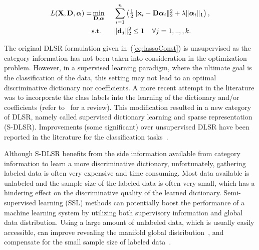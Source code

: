 \documentclass{llncs}
\begin{document}
\begin{equation}\label{eq:lassoConst}
\begin{aligned}
L(\mathbf{X},\mathbf{D},\bm{\alpha})=
& \min_{\mathbf{D},\bm{\alpha}}\
& & \sum_{i=1}^{n}\begin{pmatrix}\frac{1}{2}\|\mathbf{x}_i-\mathbf{D}\bm{\alpha}_i\|_{\textup{2}}^{2}+\lambda\|\bm{\alpha}_i\|_{1}\end{pmatrix}, \\
& \text{s.t.}
& & \|\mathbf{d}_j\|_2^2\leq1 \;\;\;\;   \forall j=1,..,,k.
\end{aligned}
\end{equation}

The original DLSR formulation given in~(\ref{eq:lassoConst}) is unsupervised as the category information has not been taken into consideration in the optimization problem. However, in a supervised learning paradigm, where the ultimate goal is the classification of the data, this setting may not lead to an optimal discriminative dictionary nor coefficients. A more recent attempt in the literature was to incorporate the class labels into the learning of the dictionary and/or coefficients (refer to~\cite{Gangeh:arxiv15} for a review). This modification resulted in a new category of DLSR, namely called supervised dictionary learning and sparse representation (S-DLSR). Improvements (some significant) over unsupervised DLSR have been reported in the literature for the classification tasks~\cite{DL:MengYang11,DL:Mairal08a,DL:Wright10,Gangeh:TSP13}.

Although S-DLSR benefits from the side information available from category information to learn a more discriminative dictionary, unfortunately, gathering labeled data is often very expensive and time consuming. Most data available is unlabeled and the sample size of the labeled data is often very small, which has a hindering effect on the discriminative quality of the learned dictionary. Semi-supervised learning (SSL) methods can potentially boost the performance of a machine learning system by utilizing both supervisory information and global data distribution. Using a large amount of unlabeled data, which is usually easily accessible, can improve revealing the manifold global distribution~\cite{SSL:Zhou04}, and compensate for the small sample size of labeled data~\cite{book:Chapelle}.
\end{document}
